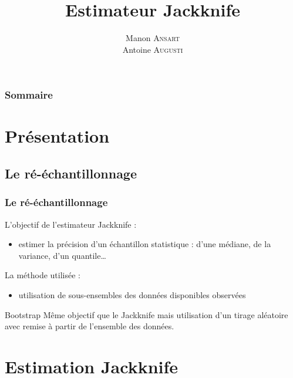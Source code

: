 \documentclass[handout]{beamer}
\title{
	Estimateur Jackknife
}
\author{
	Manon \textsc{Ansart} \\
	\vspace{10px}
	Antoine \textsc{Augusti}
}
\date{}
\begin{document}
	\begin{frame}[plain]
		\titlepage
	\end{frame}

	\begin{frame}[plain]
		\frametitle{Sommaire}
		\tableofcontents
	\end{frame}


	\section{Présentation}

		\subsection{Le ré-échantillonnage}
		\begin{frame}
			\frametitle{Le ré-échantillonnage}

			L'objectif de l'estimateur Jackknife :
			\begin{itemize}
				\item estimer la précision d'un échantillon statistique : d'une médiane, de la variance, d'un quantile\dots
			\end{itemize}

			\vspace{15px}

			La méthode utilisée :
			\begin{itemize}
				\item utilisation de sous-ensembles des données disponibles observées
			\end{itemize}

			\vspace{20px}

			\begin{exampleblock}{Bootstrap}
				Même objectif que le Jackknife mais utilisation d'un tirage aléatoire avec remise à partir de l'ensemble des données.
			\end{exampleblock}
		\end{frame}

	\section{Estimation Jackknife}
\end{document}
